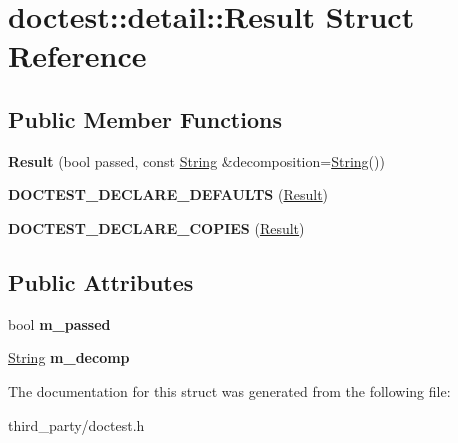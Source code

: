 \hypertarget{structdoctest_1_1detail_1_1_result}{}\section{doctest\+::detail\+::Result Struct Reference}
\label{structdoctest_1_1detail_1_1_result}
\subsection*{Public Member Functions}
\begin{DoxyCompactItemize}
\item 
\mbox{\label{structdoctest_1_1detail_1_1_result_ae4d2e8633aedaffa31f5c8b8530f522c}} 
{\bfseries Result} (bool passed, const \mbox{\hyperlink{classdoctest_1_1_string}{String}} \&decomposition=\mbox{\hyperlink{classdoctest_1_1_string}{String}}())
\item 
\mbox{\label{structdoctest_1_1detail_1_1_result_acc9895f070dcb842088b47d0c5395d42}} 
{\bfseries D\+O\+C\+T\+E\+S\+T\+\_\+\+D\+E\+C\+L\+A\+R\+E\+\_\+\+D\+E\+F\+A\+U\+L\+TS} (\mbox{\hyperlink{structdoctest_1_1detail_1_1_result}{Result}})
\item 
\mbox{\label{structdoctest_1_1detail_1_1_result_a1b48ed75f84485fb6ebbb526de8d02e4}} 
{\bfseries D\+O\+C\+T\+E\+S\+T\+\_\+\+D\+E\+C\+L\+A\+R\+E\+\_\+\+C\+O\+P\+I\+ES} (\mbox{\hyperlink{structdoctest_1_1detail_1_1_result}{Result}})
\end{DoxyCompactItemize}
\subsection*{Public Attributes}
\begin{DoxyCompactItemize}
\item 
\mbox{\label{structdoctest_1_1detail_1_1_result_a03ff571186856a429ada967ddfdf3006}} 
bool {\bfseries m\+\_\+passed}
\item 
\mbox{\label{structdoctest_1_1detail_1_1_result_a97968e037266580a799ab3deb9365b79}} 
\mbox{\hyperlink{classdoctest_1_1_string}{String}} {\bfseries m\+\_\+decomp}
\end{DoxyCompactItemize}


The documentation for this struct was generated from the following file\+:\begin{DoxyCompactItemize}
\item 
third\+\_\+party/doctest.\+h\end{DoxyCompactItemize}
